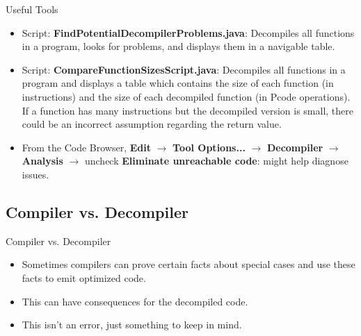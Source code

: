 \documentclass{beamer}
\begin{document}
\begin{frame}
\begin{block}{Useful Tools}
\begin{itemize}
\item Script: \textbf{FindPotentialDecompilerProblems.java}: Decompiles all functions in a program, looks for problems, and displays them in a navigable table.
\item Script: \textbf{CompareFunctionSizesScript.java}: Decompiles all functions in a program and displays a table which contains the size of each function (in instructions) and
the size of each decompiled function (in Pcode operations). If a function has many instructions but the decompiled version is small, there could be an incorrect assumption regarding
the return value.
\item From the Code Browser, \textbf{Edit} $\rightarrow$ \textbf{Tool Options...} $\rightarrow$ \textbf{Decompiler} $\rightarrow$ \textbf{Analysis} $\rightarrow$ uncheck \textbf{Eliminate unreachable code}: might help diagnose issues.
\end{itemize}
\end{block}
\end{frame}


\subsection{Compiler vs. Decompiler}
\begin{frame}
\begin{block}{Compiler vs. Decompiler}
\begin{itemize}
\item Sometimes compilers can prove certain facts about special cases and use these facts to emit optimized code.
\item This can have consequences for the decompiled code.
\item This isn't an error, just something to keep in mind.
\end{itemize}
\end{block}
\end{frame}
\end{document}
